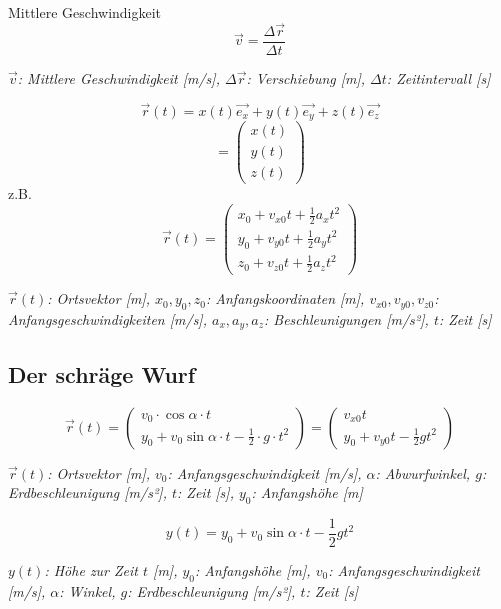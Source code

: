 \documentclass[a5paper,10pt]{article}
\newenvironment{displayformula}
{
	\begin{framed}
		\color{formulaColor}
	}
	{\end{framed}}
\newcommand{\formulalegend}[1]{%
	\par\vspace{0.5ex}%
	{{\color{legendColor}\RaggedRight\small\textit{#1}}}%
	\par\vspace{1.5ex}%
}
\begin{document}
\begin{displayformula}
	Mittlere Geschwindigkeit
	\[
	\vec{v} = \frac{\Delta \vec{r}}{\Delta t}
	\]
\end{displayformula}
\formulalegend{
	\( \vec{v} \): Mittlere Geschwindigkeit [m/s], \( \Delta \vec{r} \): Verschiebung [m], \( \Delta t \): Zeitintervall [s]
}

\begin{displayformula}
	\[
	\vec{r}(t) = x(t)\vec{e_x} + y(t)\vec{e_y} + z(t)\vec{e_z}
	\]
	\[
	=
	\begin{pmatrix}
		x(t)\\
		y(t) \\
		z(t)
	\end{pmatrix}
	\]
	z.B.
	\[
	\vec{r}(t) = \begin{pmatrix}
		x_0 + v_{x0}t + \frac{1}{2}a_x t^2 \\
		y_0 + v_{y0}t + \frac{1}{2}a_y t^2 \\
		z_0 + v_{z0}t + \frac{1}{2}a_z t^2 
	\end{pmatrix}
	\]
\end{displayformula}
\formulalegend{
	\( \vec{r}(t) \): Ortsvektor [m], \( x_0, y_0, z_0 \): Anfangskoordinaten [m], \( v_{x0}, v_{y0}, v_{z0} \): Anfangsgeschwindigkeiten [m/s], \( a_x, a_y, a_z \): Beschleunigungen [m/s²], \( t \): Zeit [s]
}
\newpage

\subsection{Der schräge Wurf}

\begin{displayformula}
	\[
	\vec{r}(t) =
	\begin{pmatrix}
		v_0 \cdot \cos\alpha \cdot t\\
		y_0 + v_0\sin\alpha \cdot t - \frac{1}{2} \cdot g \cdot t^2
	\end{pmatrix}
	=
	\begin{pmatrix}
		v_{x0} t\\
		y_0 + v_{y0} t - \frac{1}{2} g t^2
	\end{pmatrix}
	\]
\end{displayformula}
\formulalegend{
	\( \vec{r}(t) \): Ortsvektor [m], \( v_0 \): Anfangsgeschwindigkeit [m/s], \( \alpha \): Abwurfwinkel, \( g \): Erdbeschleunigung [m/s²], \( t \): Zeit [s], \( y_0 \): Anfangshöhe [m]
}

\begin{displayformula}
	\[
	y(t) = y_0 + v_0\sin\alpha \cdot t - \frac{1}{2} gt^2
	\]
\end{displayformula}
\formulalegend{
	\( y(t) \): Höhe zur Zeit \( t \) [m], \( y_0 \): Anfangshöhe [m], \( v_0 \): Anfangsgeschwindigkeit [m/s], \( \alpha \): Winkel, \( g \): Erdbeschleunigung [m/s²], \( t \): Zeit [s]
}
\end{document}
